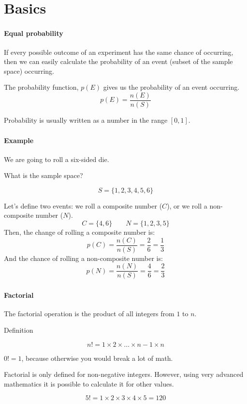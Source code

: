 \documentclass[mathserif]{beamer}
\newenvironment{compactmath}[1][\normalsize]%
	{\begin{minipage}{\textwidth}\vspace{-0.75\baselineskip}#1\begin{equation*}}
	{\end{equation*}\end{minipage}}
\newenvironment{namedframe}[1]%
	{\begin{frame}\frametitle{\secname}\framesubtitle{#1}}
	{\end{frame}}
\begin{document}
	\section{Basics}
	\begin{namedframe}{Equal probability}
		If every possible outcome of an experiment has the same chance of occurring, then we can easily calculate the probability of an event (subset of the sample space) occurring.

		The probability function, $p(E)$ gives us the probability of an event occurring.
		\[p(E) = \frac{n(E)}{n(S)}\]

		Probability is usually written as a number in the range $[0,1]$.
	\end{namedframe}
	\begin{namedframe}{Example}
		We are going to roll a six-sided die.
		\begin{exampleblock}{What is the sample space?}
			\pause
			\begin{compactmath}
				S = \{1,2,3,4,5,6\}
			\end{compactmath}
		\end{exampleblock}
		\pause
		Let's define two events: we roll a composite number ($C$), or we roll a non-composite number ($N$).
		\[C = \{4,6\} \qquad N = \{1,2,3,5\}\]
		\pause
		Then, the change of rolling a composite number is:
		\[p(C) = \frac{n(C)}{n(S)} = \frac{2}{6} = \frac{1}{3}\]
		\pause
		And the chance of rolling a non-composite number is:
		\pause
		\[p(N) = \frac{n(N)}{n(S)} = \frac{4}{6} = \frac{2}{3}\]
	\end{namedframe}
	\begin{namedframe}{Factorial}
		The factorial operation is the product of all integers from $1$ to $n$.
		\pause
		\begin{block}{Definition}
			\begin{compactmath}[\Large]
				n! = 1 \times 2 \times \dots \times n-1 \times n
			\end{compactmath}

			$0! = 1$, because otherwise you would break a lot of math.

			\scriptsize
			Factorial is only defined for non-negative integers. However, using very advanced mathematics it is possible to calculate it for other values.
		\end{block}
		\pause
		\begin{example}
			\begin{compactmath}[\large]
				5! = 1 \times 2 \times 3 \times 4 \times 5 = 120
			\end{compactmath}
		\end{example}
	\end{namedframe}
\end{document}
